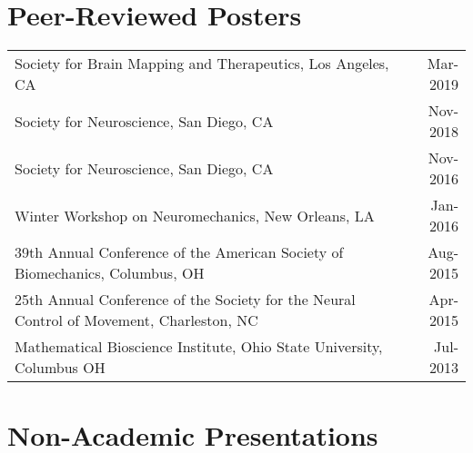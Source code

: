 \documentclass[10pt,a4paper]{article}
\begin{document}
\vspace*{2mm}\section*{Peer-Reviewed Posters}

  \vspace*{1mm}\noindent\begin{tabularx}{17cm}{X r}
    Society for Brain Mapping and Therapeutics, Los Angeles, CA & Mar-2019 \\ %
    Society for Neuroscience, San Diego, CA & Nov-2018 \\ %
    Society for Neuroscience, San Diego, CA& Nov-2016 \\ 
    Winter Workshop on Neuromechanics, New Orleans, LA & Jan-2016 \\ %
    39th Annual Conference of the American Society of Biomechanics, Columbus, OH & Aug-2015 \\
    25th Annual Conference of the Society for the Neural Control of Movement, Charleston, NC & Apr-2015 \\
    Mathematical Bioscience Institute, Ohio State University, Columbus OH & Jul-2013\\
  \end{tabularx}


  \vspace*{2mm}\section*{Non-Academic Presentations}
\end{document}
